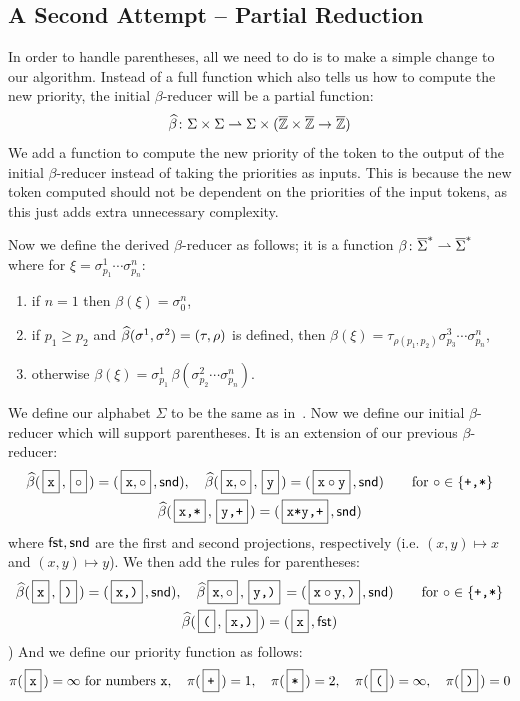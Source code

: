 \documentclass{llncs}
\newcounter{algo}
\begin{document}
\subsection{A Second Attempt -- Partial Reduction}

In order to handle parentheses, all we need to do is to make a simple change to our algorithm.
Instead of a full function which also tells us how to compute the new priority, the initial $\beta$-reducer will be a partial function:
\[ \widehat\beta\colon \Sigma\times\Sigma\rightharpoonup\Sigma\times(\overline{\mathbb Z}\times\overline{\mathbb Z}\to\overline{\mathbb Z}) \]
We add a function to compute the new priority of the token to the output of the initial $\beta$-reducer instead of taking the priorities as inputs.
This is because the new token computed should not be dependent on the priorities of the input tokens, as this just adds extra unnecessary
complexity.

Now we define the derived $\beta$-reducer as follows; it is a function $\beta\colon\overline\Sigma^*\rightharpoonup\overline\Sigma^*$ where for $\xi=\sigma^1_{p_1}\cdots\sigma^n_{p_n}$:
\begin{enumerate}
    \item if $n=1$ then $\beta(\xi)=\sigma^n_0$,
    \item if $p_1\geq p_2$ and $\widehat\beta(\sigma^1,\sigma^2)=(\tau,\rho)$ is defined, then $\beta(\xi)=\tau_{\rho(p_1,p_2)}\sigma^3_{p_3}\cdots\sigma^n_{p_n}$,
    \item otherwise $\beta(\xi)=\sigma^1_{p_1}\,\beta(\sigma^2_{p_2}\cdots\sigma^n_{p_n})$.
\end{enumerate}

We define our alphabet $\Sigma$ to be the same as in~.
Now we define our initial $\beta$-reducer which will support parentheses.
It is an extension of our previous $\beta$-reducer:
\begin{gather*}
    \hb(\mbt x,\mb\circ) = (\mb{\ttt x,\circ},\snd),\quad \hb(\mb{\ttt x,\circ},\mbt y) = (\mb{\ttt x\circ\ttt y},\snd) \qquad \hbox{for $\circ\in\set{\ttt{+,*}}$} \\
    \hb(\mbt{x,*},\mbt{y,+}) = (\mbt{x*y,+},\snd)
\end{gather*}
where $\mathsf{fst},\mathsf{snd}$ are the first and second projections, respectively (i.e. $(x,y)\mapsto x$ and $(x,y)\mapsto y$).
We then add the rules for parentheses:
\begin{gather*}
    \hb(\mbt x,\mbt)) = (\mbt{x,)},\snd),\quad \hb{\mb{\ttt x,\circ},\mbt{y,)}} = (\mb{\ttt x\circ\ttt y,\ttt)},\snd) \qquad \hbox{for $\circ\in\set{\ttt{+,*}}$} \\
    \hb(\mbt(,\mbt{x,)}) = (\mbt x,\fst)
\end{gather*}
\gobble) %
And we define our priority function as follows:
\[ \pi(\mbt x) = \infty\hbox{ for numbers \ttt x},\quad \pi(\mbt+) = 1,\quad \pi(\mbt*) = 2,\quad \pi(\mbt() = \infty,\quad \pi(\mbt)) = 0 \]
\end{document}

